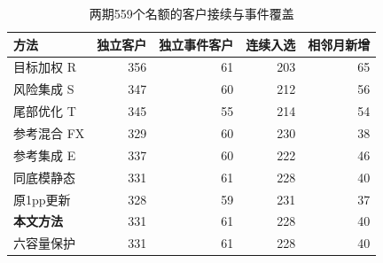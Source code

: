 \begin{table}[H]\centering\caption{两期559个名额的客户接续与事件覆盖}
\fontsize{9bp}{12bp}\selectfont
\begin{tabularx}{\linewidth}{@{}Yrrrr@{}}\toprule
方法 & 独立客户 & 独立事件客户 & 连续入选 & 相邻月新增\\\midrule
目标加权 R & 356 & 61 & 203 & 65\\
风险集成 S & 347 & 60 & 212 & 56\\
尾部优化 T & 345 & 55 & 214 & 54\\
参考混合 FX & 329 & 60 & 230 & 38\\
参考集成 E & 337 & 60 & 222 & 46\\
同底模静态 & 331 & 61 & 228 & 40\\
原1pp更新 & 328 & 59 & 231 & 37\\
\textbf{本文方法} & 331 & 61 & 228 & 40\\
六容量保护 & 331 & 61 & 228 & 40\\
\bottomrule\end{tabularx}
\end{table}